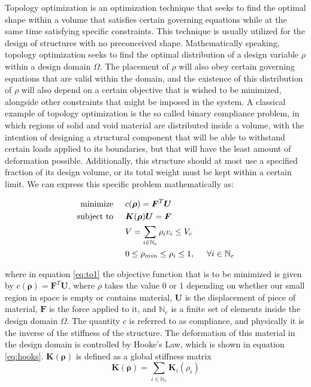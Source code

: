 \documentclass[../main.tex]{subfiles}
\begin{document}
Topology optimization is an optimization technique that seeks to find the optimal shape within a volume that satisfies certain governing equations while at the same time satisfying specific constraints. This technique is usually utilized for the design of structures with no preconceived shape. Mathematically speaking, topology optimization seeks to find the optimal distribution of a design variable $\rho$ within a design domain $\Omega$. The placement of $\rho$ will also obey certain governing equations that are valid within the domain, and the existence of this distribution of $\rho$ will also depend on a certain objective that is wished to be minimized, alongside other constraints that might be imposed in the system. A classical example of topology optimization is the so called binary compliance problem, in which regions of solid and void material are distributed inside a volume, with the intention of designing a structural component that will be able to withstand certain loads applied to its boundaries, but that will have the least amount of deformation possible. Additionally, this structure should at most use a specified fraction of its design volume, or its total weight must be kept within a certain limit. We can express this specific problem mathematically as:

\begin{align} 
  \text{minimize} & \hspace{0.5cm} c(\bm{\rho}) = \bm{F}^T \bm{U}  \label{eq:to1} \\
  \text{subject to} & \hspace{0.5cm} \bm{K}(\bm{\rho})\bm{U} = \bm{F}  \label{eq:hooks}\\
                    & \hspace{0.5cm} V = \sum _{i \in \mathbb{N}_e} \rho_i v_i \leq V_c \label{eq:volfrac} \\ 
                    & \hspace{0.5cm} 0 \leq \rho_{min}  \leq \rho_i \leq 1, \hspace{0.5cm} \forall i \in \mathbb{N}_e\label{eq:to4}
\end{align}

where in equation \ref{eq:to1} the objective function that is to be minimized is given by $c(\bm{\rho}) = \bm{F}^T \bm{U}$, where $\rho$ takes the value 0 or 1 depending on whether our small region in space is empty or contains material, $\bm{U}$ is the displacement of piece of material, $\bm{F}$ is the force applied to it, and $\mathbb{N}_e$ is a finite set of elements inside the design domain $\Omega$. The quantity $c$ is referred to as compliance, and physically it is the inverse of the stiffness of the structure. The deformation of this material in the design domain is controlled by Hooke's Law, which is shown in equation \ref{eq:hooks}. $\bm{K}(\bm{\rho})$ is defined as a global stiffness matrix \cite{hornbergerFiniteElementMethod2005}
\begin{equation}
  \bm{K}(\bm{\rho}) = \sum_{i \in \mathbb{N}_e} \bm{K}_i(\rho_i)
\end{equation}
\end{document}
